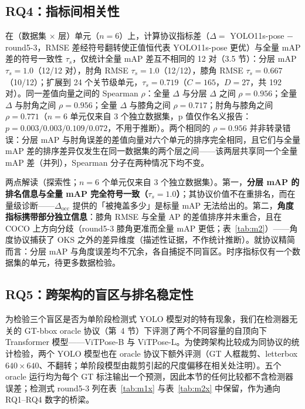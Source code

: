 \documentclass[10pt,conference]{IEEEtran}
\begin{document}
\subsection{RQ4：指标间相关性}

在（数据集 $\times$ 层）单元（$n=6$）上，计算协议指标差（$\Delta=$ YOLO11s-pose $-$ round5-3，RMSE 差经符号翻转使正值恒代表 YOLO11s-pose 更优）与全量 mAP 差的符号一致性 $\tau_s$，仅统计全量 mAP 差互不相同的 12 对（3.5 节）：分层 mAP $\tau_s=1.0$（12/12 对），肘角 RMSE $\tau_s=1.0$（12/12），膝角 RMSE $\tau_s=0.667$（10/12）；扩展到 24 个关节级单元，$\tau_s=0.719$（$C{=}165$，$D{=}27$，共 192 对）。同一差值向量之间的 Spearman $\rho$：全量 $\Delta$ 与分层 $\Delta$ 之间 $\rho=0.956$；全量 $\Delta$ 与肘角之间 $\rho=0.956$；全量 $\Delta$ 与膝角之间 $\rho=0.717$；肘角与膝角之间 $\rho=0.771$（$n=6$ 单元仅来自 3 个独立数据集，p 值仅作名义报告：$p=0.003/0.003/0.109/0.072$，不用于推断）。两个相同的 $\rho=0.956$ 并非转录错误：分层 mAP 与肘角误差的差值向量对六个单元的排序完全相同，且它们与全量 mAP 差的排序差异仅发生在同一数据集的两个层之间——该两层共享同一个全量 mAP 差（并列），Spearman 分子在两种情况下均不变。

两点解读（探索性；$n=6$ 个单元仅来自 3 个独立数据集）。第一，\textbf{分层 mAP 的排名信息与全量 mAP 完全符号一致（$\tau_s=1.0$）}；其协议价值不在重排名，而在量级诊断——$\Delta_{\mathrm{occ}}$ 提供的「被掩盖多少」是标量 mAP 无法给出的。第二，\textbf{角度指标携带部分独立信息}：膝角 RMSE 与全量 AP 的差值排序并未重合，且在 COCO 上方向分歧（round5-3 膝角更准而全量 mAP 更低；表~\ref{tab:m2}）——角度协议捕获了 OKS 之外的差异维度（描述性证据，不作统计推断）。就协议精简而言：分层 mAP 与角度误差均不冗余，各自捕捉不同盲区。时序指标仅有一个数据集的单元，待更多数据检验。

\subsection{RQ5：跨架构的盲区与排名稳定性}

为检验三个盲区是否为单阶段检测式 YOLO 模型对的特有现象，我们在检测器无关的 GT-bbox oracle 协议（第~4 节）下评测了两个不同容量的自顶向下 Transformer 模型——ViTPose-B 与 ViTPose-L。为使跨架构比较成为同协议的统计检验，两个 YOLO 模型也在 oracle 协议下额外评测（GT 人框裁剪、letterbox $640\times640$、不翻转；单阶段模型由裁剪引起的尺度偏移在相关处注明）。五个 oracle 运行均为每个 GT 标注输出一个预测，因此本节的任何比较都不含检测器误差；检测式 round5-3 列在表~\ref{tab:m1x} 与表~\ref{tab:m2x} 中保留，作为通向 RQ1--RQ4 数字的桥梁。
\end{document}
